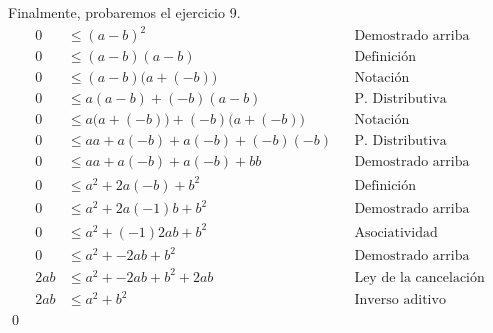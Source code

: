 \documentclass[11pt]{article}
\begin{document}
\begin{enumerate}
Finalmente, probaremos el ejercicio 9. \begin{align*}
  0 &\leq (a-b)^2 && \text{Demostrado arriba}\\
  0 &\leq (a-b)(a-b) && \text{Definición}\\
  0 &\leq (a-b)\bigl(a + (-b)\bigr) && \text{Notación}\\
  0 &\leq a(a-b)+(-b)(a-b) && \text{P. Distributiva}\\
  0 &\leq a\bigl(a+(-b)\bigr)+(-b)\bigl(a+(-b)\bigr) && \text{Notación}\\
  0 &\leq aa+a(-b)+a(-b)+(-b)(-b) && \text{P. Distributiva}\\
  0 &\leq aa+a(-b)+a(-b)+bb && \text{Demostrado arriba}\\
  0 &\leq a^2+2a(-b)+b^2 && \text{Definición}\\
  0 &\leq a^2+2a(-1)b+b^2 && \text{Demostrado arriba}\\
  0 &\leq a^2+(-1)2ab+b^2 && \text{Asociatividad}\\
  0 &\leq a^2+-2ab+b^2 && \text{Demostrado arriba}\\
  2ab &\leq a^2+-2ab+b^2 + 2ab&& \text{Ley de la cancelación}\\
  2ab &\leq a^2+b^2&& \text{Inverso aditivo}
\end{align*}\qed
  
\end{enumerate}
\end{document}
